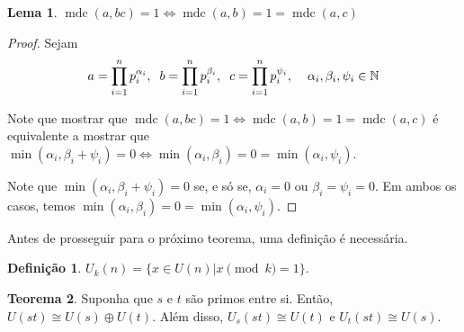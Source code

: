 \documentclass[a4paper,portuguese,11pt,twoside, leqno]{book}
\DeclareMathOperator{\mdc}{mdc}
\theoremstyle{definition}
\newtheorem{theorem}{Teorema}[section]
\newtheorem{lemma}[theorem]{Lema}
\newtheorem{deff}{Definição}[section]
\begin{document}
	\begin{lemma}
		\label{lema2}
		$\mdc(a,bc) = 1 \Leftrightarrow \mdc(a,b) = 1 = \mdc(a,c)$ 
		
	\end{lemma}
	
	\begin{proof}
		Sejam 
		\begin{align*}
		a = \prod_{i = 1}^{n}p_i^{\alpha_i},\hspace{0.2cm}
		b = \prod_{i = 1}^{n}p_i^{\beta_i}, \hspace{0.2cm}
		c = \prod_{i = 1}^{n}p_i^{\psi_i}, \hspace{0.4cm}\alpha_i, \beta_i, \psi_i\in\mathbb{N}
		\end{align*}
		\par\vspace{0.3cm} Note que mostrar que $\mdc(a,bc) = 1 \Leftrightarrow \mdc(a,b) = 1 = \mdc(a,c)$ é equivalente a mostrar que $\min(\alpha_i, \beta_i + \psi_i) = 0 \Leftrightarrow \min(\alpha_i, \beta_i) = 0 = \min(\alpha_i, \psi_i)$.
		\par\vspace{0.3cm} Note que $\min(\alpha_i, \beta_i + \psi_i) = 0$ se, e só se, $\alpha_i = 0$ ou $\beta_i = \psi_i = 0$. Em ambos os casos, temos $\min(\alpha_i, \beta_i) = 0 = \min(\alpha_i, \psi_i)$.
		
	\end{proof}
	\par\vspace{0.3cm} Antes de prosseguir para o próximo teorema, uma definição é necessária.
	\begin{deff}
		\label{def U_k(n)}
		$U_k(n) = \{x\in U(n)|x\pmod k = 1 \}$.
	\end{deff}
	
	\begin{theorem}
		\label{produto direto}
		Suponha que $s$ e $t$ são primos entre si. Então, $U(st)\cong U(s)\oplus U(t)$. Além disso, $U_s(st)\cong U(t)$ e $U_t(st)\cong U(s).$
	\end{theorem}
	
\end{document}
